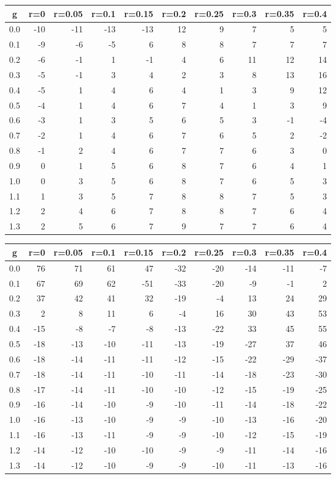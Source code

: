 %
\begin{table}[!tbp]
 \begin{center}
 \begin{tabular}{rrrrrrrrrr}\hline\hline
\multicolumn{1}{c}{g}&\multicolumn{1}{c}{r=0}&\multicolumn{1}{c}{r=0.05}&\multicolumn{1}{c}{r=0.1}&\multicolumn{1}{c}{r=0.15}&\multicolumn{1}{c}{r=0.2}&\multicolumn{1}{c}{r=0.25}&\multicolumn{1}{c}{r=0.3}&\multicolumn{1}{c}{r=0.35}&\multicolumn{1}{c}{r=0.4}\tabularnewline
\hline
0.0&-10&-11&-13&-13&12&9& 7& 5& 5\tabularnewline
0.1& -9& -6& -5&  6& 8&8& 7& 7& 7\tabularnewline
0.2& -6& -1&  1& -1& 4&6&11&12&14\tabularnewline
0.3& -5& -1&  3&  4& 2&3& 8&13&16\tabularnewline
0.4& -5&  1&  4&  6& 4&1& 3& 9&12\tabularnewline
0.5& -4&  1&  4&  6& 7&4& 1& 3& 9\tabularnewline
0.6& -3&  1&  3&  5& 6&5& 3&-1&-4\tabularnewline
0.7& -2&  1&  4&  6& 7&6& 5& 2&-2\tabularnewline
0.8& -1&  2&  4&  6& 7&7& 6& 3& 0\tabularnewline
0.9&  0&  1&  5&  6& 8&7& 6& 4& 1\tabularnewline
1.0&  0&  3&  5&  6& 8&7& 6& 5& 3\tabularnewline
1.1&  1&  3&  5&  7& 8&8& 7& 5& 3\tabularnewline
1.2&  2&  4&  6&  7& 8&8& 7& 6& 4\tabularnewline
1.3&  2&  5&  6&  7& 9&7& 7& 6& 4\tabularnewline
\hline
\end{tabular}

\end{center}

\end{table}

%
\begin{table}[!tbp]
 \begin{center}
 \begin{tabular}{rrrrrrrrrr}\hline\hline
\multicolumn{1}{c}{g}&\multicolumn{1}{c}{r=0}&\multicolumn{1}{c}{r=0.05}&\multicolumn{1}{c}{r=0.1}&\multicolumn{1}{c}{r=0.15}&\multicolumn{1}{c}{r=0.2}&\multicolumn{1}{c}{r=0.25}&\multicolumn{1}{c}{r=0.3}&\multicolumn{1}{c}{r=0.35}&\multicolumn{1}{c}{r=0.4}\tabularnewline
\hline
0.0& 76& 71& 61& 47&-32&-20&-14&-11& -7\tabularnewline
0.1& 67& 69& 62&-51&-33&-20& -9& -1&  2\tabularnewline
0.2& 37& 42& 41& 32&-19& -4& 13& 24& 29\tabularnewline
0.3&  2&  8& 11&  6& -4& 16& 30& 43& 53\tabularnewline
0.4&-15& -8& -7& -8&-13&-22& 33& 45& 55\tabularnewline
0.5&-18&-13&-10&-11&-13&-19&-27& 37& 46\tabularnewline
0.6&-18&-14&-11&-11&-12&-15&-22&-29&-37\tabularnewline
0.7&-18&-14&-11&-10&-11&-14&-18&-23&-30\tabularnewline
0.8&-17&-14&-11&-10&-10&-12&-15&-19&-25\tabularnewline
0.9&-16&-14&-10& -9&-10&-11&-14&-18&-22\tabularnewline
1.0&-16&-13&-10& -9& -9&-10&-13&-16&-20\tabularnewline
1.1&-16&-13&-11& -9& -9&-10&-12&-15&-19\tabularnewline
1.2&-14&-12&-10&-10& -9& -9&-11&-14&-16\tabularnewline
1.3&-14&-12&-10& -9& -9&-10&-11&-13&-16\tabularnewline
\hline
\end{tabular}

\end{center}

\end{table}

